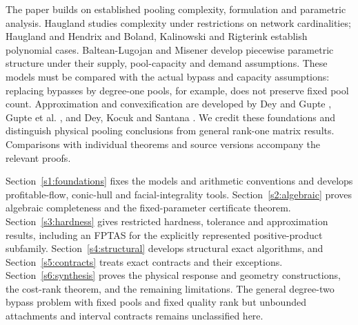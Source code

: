 The paper builds on established pooling complexity, formulation and
parametric analysis. Haugland
\cite{haugland2016-the-computational-complexity-of-the} studies complexity
under restrictions on network cardinalities; Haugland and Hendrix
\cite{s3:haugland-hendrix2016} and Boland, Kalinowski and Rigterink
\cite{s4:boland2017} establish polynomial cases.
Baltean-Lugojan and Misener \cite{s3:baltean2018} develop piecewise
parametric structure under their supply, pool-capacity and demand
assumptions. These models must be compared with the actual bypass and
capacity assumptions: replacing bypasses by degree-one pools, for
example, does not preserve fixed pool count. Approximation and
convexification are developed by Dey and Gupte
\cite{dey2015-analysis-of-milp-techniques-for}, Gupte et al.
\cite{gupte2017-relaxations-and-discretizations-for-the}, and Dey, Kocuk
and Santana \cite{dey2020-convexifications-of-rank-one-based}.
We credit these foundations and distinguish physical pooling conclusions
from general rank-one matrix results. Comparisons with individual
theorems and source versions accompany the relevant proofs.

Section~\ref{s1:foundations} fixes the models and arithmetic conventions
and develops profitable-flow, conic-hull and facial-integrality tools.
Section~\ref{s2:algebraic} proves algebraic completeness and the
fixed-parameter certificate theorem. Section~\ref{s3:hardness} gives
restricted hardness, tolerance and approximation results, including an
FPTAS for the explicitly represented positive-product subfamily.
Section~\ref{s4:structural} develops structural exact algorithms, and
Section~\ref{s5:contracts} treats exact contracts and their exceptions.
Section~\ref{s6:synthesis} proves the physical response and geometry
constructions, the cost-rank theorem, and the remaining limitations.
The general degree-two bypass problem with fixed pools and fixed
quality rank but unbounded attachments and interval contracts remains
unclassified here.
